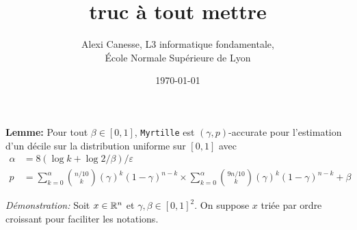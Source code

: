 
\usepackage{tkz-base}
\usepackage{algorithm}
\usepackage{algorithmic}
\setlength\parindent{0pt}





\title{truc à tout mettre}           
\author{Alexi Canesse, L3 informatique fondamentale,\\École Normale Supérieure de Lyon}
\date{\today}          

\sloppy                  

\pgfplotsset{compat=1.16}







\textbf{Lemme: } Pour tout \(\beta \in [0,1]\), \texttt{Myrtille} est \((\gamma, p)\)-accurate pour l'estimation d'un décile sur la distribution uniforme sur \([0,1]\) avec
\begin{align*}
    \alpha & = 8\left( \log k + \log 2/\beta \right)/\varepsilon\\
    p & = \sum_{k = 0}^{\alpha} \binom{n/10}{k}\left( \gamma \right)^k (1 - \gamma)^{n-k} \times \sum_{k = 0}^{\alpha} \binom{9n/10}{k}\left( \gamma \right)^k (1 - \gamma)^{n-k} + \beta
\end{align*}



\textit{Démonstration:} Soit \(x \in \mathbb{R}^n\) et \(\gamma, \beta \in [0,1]^2\). On suppose \(x\) triée par ordre croissant pour faciliter les notations.\\

